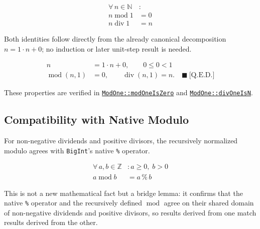 \begin{equation*}
\begin{aligned}
\forall\, n \in \mathbb{N} &: \\
n \operatorname{mod} 1 &= 0 \\
n \operatorname{div} 1 &= n
\end{aligned}
\end{equation*}

Both identities follow directly from the already canonical decomposition
$n=1\cdot n+0$; no induction or later unit-step result is needed.

\begin{equation*}
\begin{aligned}
n &= 1\cdot n+0,\qquad 0\leq 0<1 \\
\operatorname{mod}(n,1) &= 0,\qquad \operatorname{div}(n,1)=n.
  \quad \blacksquare\ \text{[Q.E.D.]}
\end{aligned}
\end{equation*}

These properties are verified in
\href{https://github.com/thiagomata/prime-numbers/blob/modulo-article-v1.0.0/src/main/scala/v1/chapter2/div/properties/ModOne.scala}{\texttt{ModOne::modOneIsZero}}
and
\href{https://github.com/thiagomata/prime-numbers/blob/modulo-article-v1.0.0/src/main/scala/v1/chapter2/div/properties/ModOne.scala}{\texttt{ModOne::divOneIsN}}.

\subsection{Compatibility with Native Modulo}
\label{sec:native-compatibility}

For non-negative dividends and positive divisors, the recursively normalized
modulo agrees with \texttt{BigInt}'s native \texttt{\%} operator.

\begin{equation*}
\begin{aligned}
\forall\, a, b \in \mathbb{Z} &: a \geq 0,\; b > 0 \\
a \operatorname{mod} b &= a \mathbin{\%} b
\end{aligned}
\end{equation*}

This is not a new mathematical fact but a bridge lemma: it confirms that the
native \texttt{\%} operator and the recursively defined
$\operatorname{mod}$ agree on their shared domain of non-negative dividends
and positive divisors, so results derived from one match results derived from
the other.

